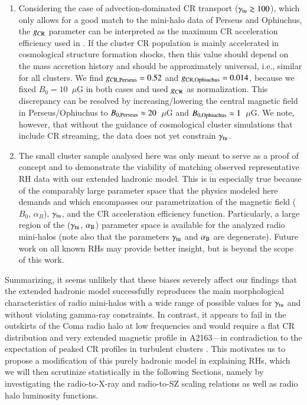 \documentclass[useAMS,usenatbib]{mn2e}
\begin{document}
\begin{enumerate}
\item Considering the case of advection-dominated CR transport
  ($\gamma_{{\mathrm{tu}}}\gtrsim100$), which only allows for a good match to the
  mini-halo data of Perseus and Ophiuchus, the $g_{{\mathrm{CR}}}$ parameter can be
  interpreted as the maximum CR acceleration efficiency used in
  \cite{2010MNRAS.409..449P}. If the cluster CR population is mainly accelerated
  in cosmological structure formation shocks, then this value should depend on
  the mass accretion history and should be approximately universal, i.e.,
  similar for all clusters. We find $g_{{\mathrm{CR, Perseus}}} = 0.52$ and
  $g_{{\mathrm{CR, Ophiuchus}}} = 0.014$, because we fixed $B_{0}=10$~$\mu$G in both
  cases and used $g_{{\mathrm{CR}}}$ as normalization. This discrepancy can be
  resolved by increasing/lowering the central magnetic field in
  Perseus/Ophiuchus to $B_{0,{\mathrm{Perseus}}}\approx20$~$\mu$G and
  $B_{0,{\mathrm{Ophiuchus}}}\approx1$~$\mu$G. We note, however, that without the
  guidance of cosmological cluster simulations that include CR streaming, the
  data does not yet constrain $\gamma_{{\mathrm{tu}}}$.
\item The small cluster sample analysed here was only meant to serve as a proof
  of concept and to demonstrate the viability of matching observed
  representative RH data with our extended hadronic model. This is in especially
  true because of the comparably large parameter space that the physics modeled
  here demands and which encompasses our parametrization of the magnetic field
  ($B_0$, $\alpha_B$), $\gamma_{{\mathrm{tu}}}$, and the CR acceleration efficiency
  function. Particularly, a large region of the ($\gamma_{{\mathrm{tu}}}$,
  $\alpha_{{\mathrm{B}}}$) parameter space is available for the analyzed radio
  mini-halos (note also that the parameters $\gamma_{{\mathrm{tu}}}$ and
  $\alpha_{{\mathrm{B}}}$ are degenerate). Future work on all known RHs may provide
  better insight, but is beyond the scope of this work.
\end{enumerate}

Summarizing, it seems unlikely that these biases severely affect our findings
that the extended hadronic model successfully reproduces the main morphological
characteristics of radio mini-halos with a wide range of possible values for
$\gamma_{{\mathrm{tu}}}$ and without violating gamma-ray constraints. In contrast, it
appears to fail in the outskirts of the Coma radio halo at low frequencies and
would require a flat CR distribution and very extended magnetic profile in
A2163---in contradiction to the expectation of peaked CR profiles in turbulent
clusters \citep{2011A&A...527A..99E}. This motivates us to propose a
modification of this purely hadronic model in explaining RHs, which we will then
scrutinize statistically in the following Sections, namely by investigating the
radio-to-X-ray and radio-to-SZ scaling relations as well as radio halo
luminosity functions.
\end{document}
